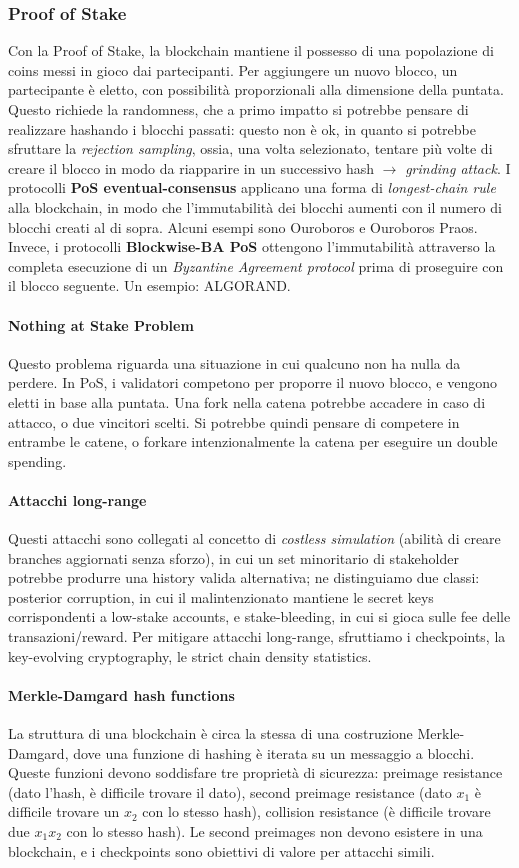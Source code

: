 \documentclass[11pt]{article}
\begin{document}
\subsubsection{Proof of Stake} Con la Proof of Stake, la blockchain mantiene il possesso di una popolazione di coins messi in gioco dai partecipanti. Per aggiungere un nuovo blocco, un partecipante è eletto, con possibilità proporzionali alla dimensione della puntata. Questo richiede la randomness, che a primo impatto si potrebbe pensare di realizzare hashando i blocchi passati: questo non è ok, in quanto si potrebbe sfruttare la \textit{rejection sampling}, ossia, una volta selezionato, tentare più volte di creare il blocco in modo da riapparire in un successivo hash $\rightarrow$ \textit{grinding attack}.
I protocolli \textbf{PoS eventual-consensus} applicano una forma di \textit{longest-chain rule} alla blockchain, in modo che l'immutabilità dei blocchi aumenti con il numero di blocchi creati al di sopra. Alcuni esempi sono Ouroboros e Ouroboros Praos. 
Invece, i protocolli \textbf{Blockwise-BA PoS} ottengono l'immutabilità attraverso la completa esecuzione di un \textit{Byzantine Agreement protocol} prima di proseguire con il blocco seguente. Un esempio: ALGORAND. 
\paragraph{Nothing at Stake Problem} Questo problema riguarda una situazione in cui qualcuno non ha nulla da perdere. In PoS, i validatori competono per proporre il nuovo blocco, e vengono eletti in base alla puntata. Una fork nella catena potrebbe accadere in caso di attacco, o due vincitori scelti. Si potrebbe quindi pensare di competere in entrambe le catene, o forkare intenzionalmente la catena per eseguire un double spending.
\paragraph{Attacchi long-range} Questi attacchi sono collegati al concetto di \textit{costless simulation} (abilità di creare branches aggiornati senza sforzo), in cui un set minoritario di stakeholder potrebbe produrre una history valida alternativa; ne distinguiamo due classi: posterior corruption, in cui il malintenzionato mantiene le secret keys corrispondenti a low-stake accounts, e stake-bleeding, in cui si gioca sulle fee delle transazioni/reward. Per mitigare attacchi long-range, sfruttiamo i checkpoints, la key-evolving cryptography, le strict chain density statistics. 
\paragraph{Merkle-Damgard hash functions} 
La struttura di una blockchain è circa la stessa di una costruzione Merkle-Damgard, dove una funzione di hashing è iterata su un messaggio a blocchi. Queste funzioni devono soddisfare tre proprietà di sicurezza: preimage resistance (dato l'hash, è difficile trovare il dato), second preimage resistance (dato $x_1$ è difficile trovare un $x_2$ con lo stesso hash), collision resistance (è difficile trovare due $x_1 x_2$ con lo stesso hash). Le second preimages non devono esistere in una blockchain, e i checkpoints sono obiettivi di valore per attacchi simili. 
\end{document}
